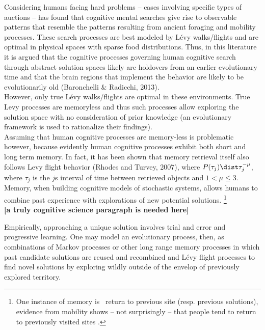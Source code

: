 Considering humans facing hard problems -- cases involving specific types of auctions --  \cite{baronchelli2013levy} has found that cognitive mental searches give rise to observable patterns \cite{rhodes2007human,radicchi2012rationality,radicchi2012evolution} that resemble the patterns resulting from ancient foraging and mobility processes. These search processes are best modeled by L\'evy walks/flights and are optimal in physical spaces with sparse food distributions.  Thus, in this literature it is argued that the cognitive processes governing human cognitive search through abstract solution spaces likely are holdovers from an earlier evolutionary time and that the brain regions that implement the behavior are likely to be evolutionarily old (Baronchelli \& Radicchi, 2013).  \\
However, only true L\'evy walks/flights are optimal in these environments. True L\’evy processes are memoryless and thus such processes allow exploring the solution space with no consideration of prior knowledge (an evolutionary framework is used to rationalize their findings).\\

Assuming that human cognitive processes are memory-less is problematic however, because evidently human cognitive processes exhibit both short and long term memory.  In fact, it has been shown that memory retrieval itself also follows L\’evy flight behavior (Rhodes and Turvey, 2007), where $P(\tau_j) \dist \tau_j^{-\mu}$, where $\tau_j$ is the $j$s interval of time between retrieved objects and $1<\mu \leq 3$.  Memory, when building cognitive models of stochastic systems, allows humans to combine past experience with explorations of new potential solutions. \footnote{One instance of memory is \
return to previous site (resp. previous solutions), evidence from mobility shows -- not surprisingly -- that people tend to return to previously visited sites \cite{}.}\\

{\bf [a truly cognitive science paragraph is needed here]}

Empirically, approaching a unique solution involves trial and error and progressive learning. One may model an evolutionary process, then, as combinations of Markov processes \cite{} or other long range memory processes in which past candidate solutions  are reused and recombined and L\'evy flight processes to find novel solutions by exploring wildly outside of the envelop of previously explored territory.\\

